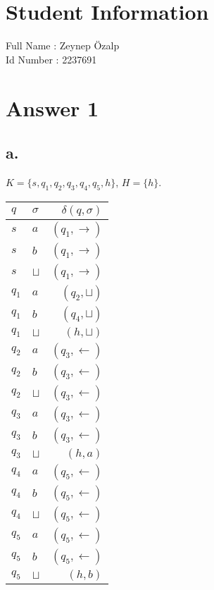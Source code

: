 \documentclass[12pt]{article}
\begin{document}
\section*{Student Information } 
Full Name : Zeynep Özalp \\
Id Number : 2237691 \\

\section*{Answer 1}
\subsection*{a.}
$K=\{s,q_1,q_2,q_3,q_4,q_5,h\}$, $H=\{h\}$. \\

\begin{tabular}{|ll|r|}
\hline
$q$ & $\sigma$ & $\delta (q, \sigma)$ \\
\hline
$s$ & $a$ & $(q_1, \rightarrow)$ \\
$s$ & $b$ & $(q_1, \rightarrow)$ \\
$s$ & $\sqcup$ & $(q_1, \rightarrow)$ \\
$q_1$ & $a$ & $(q_2, \sqcup)$ \\
$q_1$ & $b$ & $(q_4, \sqcup)$ \\
$q_1$ & $\sqcup$ & $(h, \sqcup)$ \\
$q_2$ & $a$ & $(q_3, \leftarrow)$ \\
$q_2$ & $b$ & $(q_3, \leftarrow)$ \\
$q_2$ & $\sqcup$ & $(q_3, \leftarrow)$ \\
$q_3$ & $a$ & $(q_3, \leftarrow)$ \\
$q_3$ & $b$ & $(q_3, \leftarrow)$ \\
$q_3$ & $\sqcup$ & $(h, a)$ \\
$q_4$ & $a$ & $(q_5, \leftarrow)$ \\
$q_4$ & $b$ & $(q_5, \leftarrow)$ \\
$q_4$ & $\sqcup$ & $(q_5, \leftarrow)$ \\
$q_5$ & $a$ & $(q_5, \leftarrow)$ \\
$q_5$ & $b$ & $(q_5, \leftarrow)$ \\
$q_5$ & $\sqcup$ & $(h, b)$ \\
\hline
\end{tabular}
\end{document}
